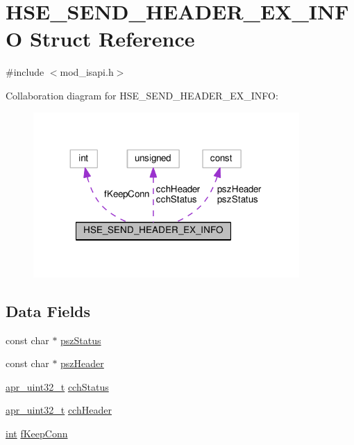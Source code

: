 \hypertarget{structHSE__SEND__HEADER__EX__INFO}{}\section{H\+S\+E\+\_\+\+S\+E\+N\+D\+\_\+\+H\+E\+A\+D\+E\+R\+\_\+\+E\+X\+\_\+\+I\+N\+FO Struct Reference}
\label{structHSE__SEND__HEADER__EX__INFO}


{\ttfamily \#include $<$mod\+\_\+isapi.\+h$>$}



Collaboration diagram for H\+S\+E\+\_\+\+S\+E\+N\+D\+\_\+\+H\+E\+A\+D\+E\+R\+\_\+\+E\+X\+\_\+\+I\+N\+FO\+:
\nopagebreak
\begin{figure}[H]
\begin{center}
\leavevmode
\includegraphics[width=287pt]{structHSE__SEND__HEADER__EX__INFO__coll__graph}
\end{center}
\end{figure}
\subsection*{Data Fields}
\begin{DoxyCompactItemize}
\item 
const char $\ast$ \hyperlink{structHSE__SEND__HEADER__EX__INFO_a5ffd926750565b35c8e6f3d86cd99995}{psz\+Status}
\item 
const char $\ast$ \hyperlink{structHSE__SEND__HEADER__EX__INFO_a29ed9f43b879af18ca7b8e32181d10e4}{psz\+Header}
\item 
\hyperlink{group__apr__platform_ga558548a135d8a816c4787250744ea147}{apr\+\_\+uint32\+\_\+t} \hyperlink{structHSE__SEND__HEADER__EX__INFO_a52a42b246576ffcc9c6735eb7854f29b}{cch\+Status}
\item 
\hyperlink{group__apr__platform_ga558548a135d8a816c4787250744ea147}{apr\+\_\+uint32\+\_\+t} \hyperlink{structHSE__SEND__HEADER__EX__INFO_a679a6c2e10196b3b5d060935fa096a6d}{cch\+Header}
\item 
\hyperlink{pcre_8txt_a42dfa4ff673c82d8efe7144098fbc198}{int} \hyperlink{structHSE__SEND__HEADER__EX__INFO_a3b5a6d43ed47f2a5eee5f00981e1507c}{f\+Keep\+Conn}
\end{DoxyCompactItemize}


